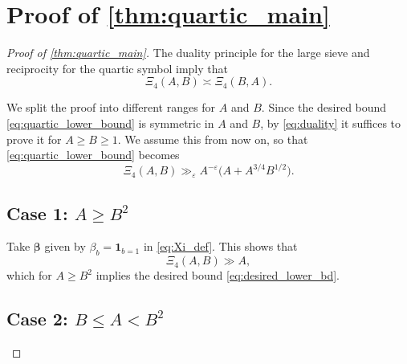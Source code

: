 \documentclass[12pt,reqno]{amsart}
\numberwithin{equation}{section}
\begin{document}

\section{Proof of \cref{thm:quartic_main}}

\begin{proof}[Proof of \cref{thm:quartic_main}]
    The duality principle for the large sieve \cite[(7.9) to (7.11)]{IK} and reciprocity for the quartic symbol imply \cite[Lemma~3.1]{BGL} that
    \begin{equation} \label{eq:duality}
        \Xi_4(A, B) \asymp \Xi_4(B, A).
    \end{equation}

We split the proof into different ranges for $A$ and $B$. Since the desired bound \eqref{eq:quartic_lower_bound} is symmetric in $A$ and $B$, by \eqref{eq:duality} it suffices to prove it for $A \geq B \geq 1$. We assume this from now on, so that \eqref{eq:quartic_lower_bound} becomes
    \begin{equation}\label{eq:desired_lower_bd}
        \Xi_4(A, B) \gg_\varepsilon A^{-\varepsilon} \big(A + A^{3/4} B^{1/2} \big).
    \end{equation}

    \subsection{Case 1: \texorpdfstring{$A \geq B^2$}{}} 

    Take $\boldsymbol{\beta}$ given by $\beta_{b} = \boldsymbol{1}_{b = 1}$ in \eqref{eq:Xi_def}. This shows that 
    \begin{equation*}
        \Xi_4(A, B) \gg A, 
    \end{equation*}
    which for $A \geq B^2$ implies the desired bound \eqref{eq:desired_lower_bd}.

 \subsection{Case 2: $B \leq A < B^2$}


\end{proof}
\end{document}
